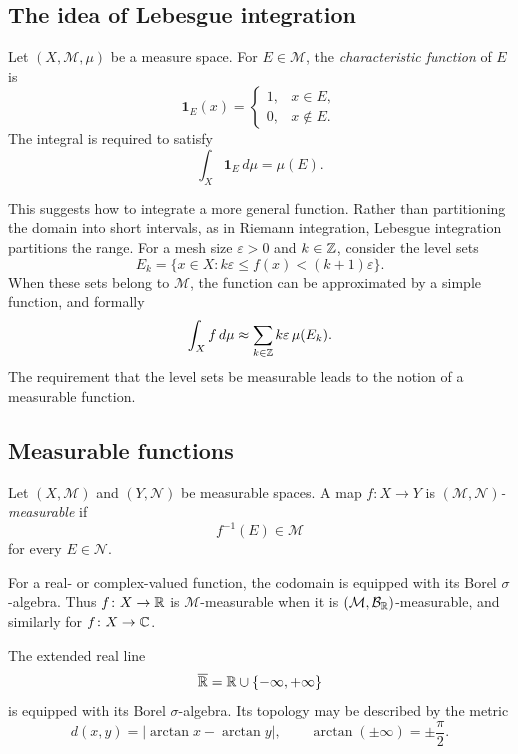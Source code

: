 \subsection{The idea of Lebesgue integration}

Let $(X,\mathcal M,\mu)$ be a measure space. For $E\in\mathcal M$, the
\emph{characteristic function} of $E$ is
\[
  \mathbf 1_E(x)=
  \begin{cases}
    1,&x\in E,\\
    0,&x\notin E.
  \end{cases}
\]
The integral is required to satisfy
\[
  \int_X\mathbf 1_E\,d\mu=\mu(E).
\]

This suggests how to integrate a more general function. Rather than
partitioning the domain into short intervals, as in Riemann integration,
Lebesgue integration partitions the range. For a mesh size
$\varepsilon>0$ and $k\in\mathbb{Z}$, consider the level sets
\[
  E_k=\{x\in X:k\varepsilon\leq f(x)<(k+1)\varepsilon\}.
\]
When these sets belong to $\mathcal M$, the function can be approximated
by a simple function, and formally
\[
  \int_X f\,d\mu
  \approx\sum_{k\in\mathbb{Z}}k\varepsilon\,\mu(E_k).
\]
The requirement that the level sets be measurable leads to the notion
of a measurable function.

\subsection{Measurable functions}

\begin{definition}
  Let $(X,\mathcal M)$ and $(Y,\mathcal N)$ be measurable spaces. A map
  $f\colon X\to Y$ is \emph{$(\mathcal M,\mathcal N)$-measurable} if
  \[
    f^{-1}(E)\in\mathcal M
  \]
  for every $E\in\mathcal N$.
\end{definition}

For a real- or complex-valued function, the codomain is equipped with
its Borel $\sigma$-algebra. Thus $f\colon X\to\mathbb{R}$ is
$\mathcal M$-measurable when it is
$(\mathcal M,\mathcal B_{\mathbb{R}})$-measurable, and similarly for
$f\colon X\to\mathbb{C}$.

The extended real line
\[
  \overline{\mathbb{R}}=\mathbb{R}\cup\{-\infty,+\infty\}
\]
is equipped with its Borel $\sigma$-algebra. Its topology may be
described by the metric
\[
  d(x,y)=|\arctan x-\arctan y|,
  \qquad
  \arctan(\pm\infty)=\pm\frac{\pi}{2}.
\]


